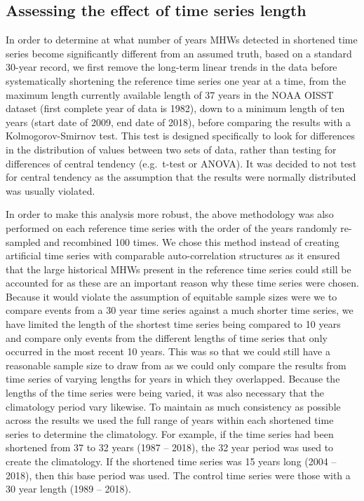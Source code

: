 \documentclass[]{article}
\begin{document}
\hypertarget{assessing-the-effect-of-time-series-length}{%
\subsection{Assessing the effect of time series
length}\label{assessing-the-effect-of-time-series-length}}

In order to determine at what number of years MHWs detected in shortened
time series become significantly different from an assumed truth, based
on a standard 30-year record, we first remove the long-term linear
trends in the data before systematically shortening the reference time
series one year at a time, from the maximum length currently available
length of 37 years in the NOAA OISST dataset (first complete year of
data is 1982), down to a minimum length of ten years (start date of
2009, end date of 2018), before comparing the results with a
Kolmogorov-Smirnov test. This test is designed specifically to look for
differences in the distribution of values between two sets of data,
rather than testing for differences of central tendency (e.g.~t-test or
ANOVA). It was decided to not test for central tendency as the
assumption that the results were normally distributed was usually
violated.

In order to make this analysis more robust, the above methodology was
also performed on each reference time series with the order of the years
randomly re-sampled and recombined 100 times. We chose this method
instead of creating artificial time series with comparable
auto-correlation structures as it ensured that the large historical MHWs
present in the reference time series could still be accounted for as
these are an important reason why these time series were chosen. Because
it would violate the assumption of equitable sample sizes were we to
compare events from a 30 year time series against a much shorter time
series, we have limited the length of the shortest time series being
compared to 10 years and compare only events from the different lengths
of time series that only occurred in the most recent 10 years. This was
so that we could still have a reasonable sample size to draw from as we
could only compare the results from time series of varying lengths for
years in which they overlapped. Because the lengths of the time series
were being varied, it was also necessary that the climatology period
vary likewise. To maintain as much consistency as possible across the
results we used the full range of years within each shortened time
series to determine the climatology. For example, if the time series had
been shortened from 37 to 32 years (1987 -- 2018), the 32 year period
was used to create the climatology. If the shortened time series was 15
years long (2004 -- 2018), then this base period was used. The control
time series were those with a 30 year length (1989 -- 2018).
\end{document}
